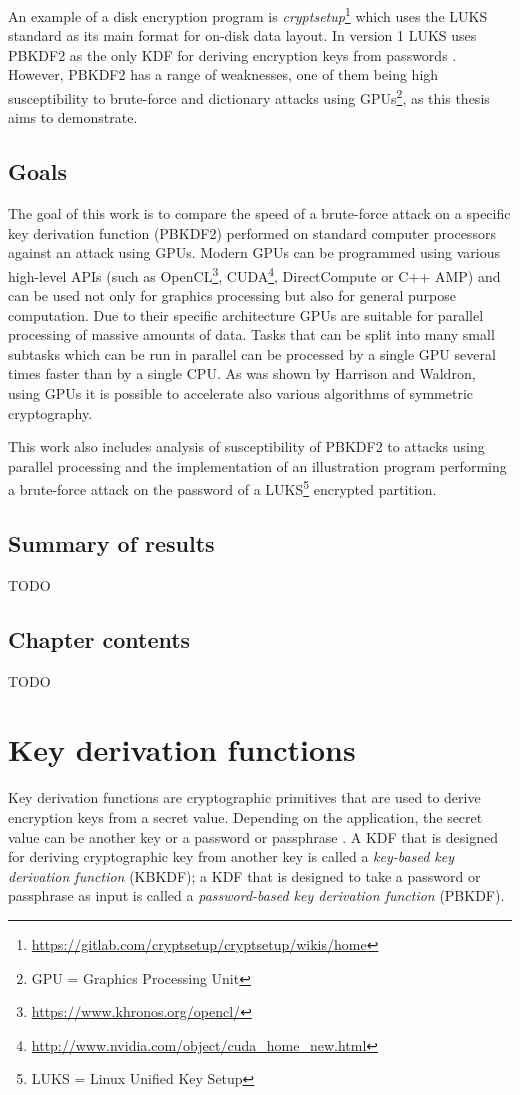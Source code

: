 \documentclass[12pt,oneside]{fithesis2}
\begin{document}
      An example of a disk encryption program is \emph{cryptsetup}\footnote{\url{https://gitlab.com/cryptsetup/cryptsetup/wikis/home}} which uses the LUKS standard as its main format for on-disk data layout. In version 1 LUKS uses PBKDF2 as the only KDF for deriving encryption keys from passwords \cite{luks}. However, PBKDF2 has a range of weaknesses, one of them being high susceptibility to brute-force and dictionary attacks using GPUs\footnote{GPU = Graphics Processing Unit}, as this thesis aims to demonstrate.
    
      \section{Goals}
      The goal of this work is to compare the speed of a brute-force attack on a specific key derivation function (PBKDF2) performed on standard computer processors against an attack using GPUs. Modern GPUs can be programmed using various high-level APIs (such as OpenCL\footnote{\url{https://www.khronos.org/opencl/}}, CUDA\footnote{\url{http://www.nvidia.com/object/cuda_home_new.html}}, DirectCompute or C++ AMP) and can be used not only for graphics processing but also for general purpose computation. Due to their specific architecture GPUs are suitable for parallel processing of massive amounts of data. Tasks that can be split into many small subtasks which can be run in parallel can be processed by a single GPU several times faster than by a single CPU. As was shown by Harrison and Waldron\cite{Harrison}, using GPUs it is possible to accelerate also various algorithms of symmetric cryptography.
    
      This work also includes analysis of susceptibility of PBKDF2 to attacks using parallel processing and the implementation of an illustration program performing a brute-force attack on the password of a LUKS\footnote{LUKS = Linux Unified Key Setup} encrypted partition.
    
      \section{Summary of results}
      TODO
    
      \section{Chapter contents}
      TODO
    
    \chapter{Key derivation functions}
      Key derivation functions are cryptographic primitives that are used to derive encryption keys from a secret value. Depending on the application, the secret value can be another key or a password or passphrase \cite{wikiKDF}. A KDF that is designed for deriving cryptographic key from another key is called a \emph{key-based key derivation function} (KBKDF); a KDF that is designed to take a password or passphrase as input is called a \emph{password-based key derivation function} (PBKDF).
      
\end{document}
